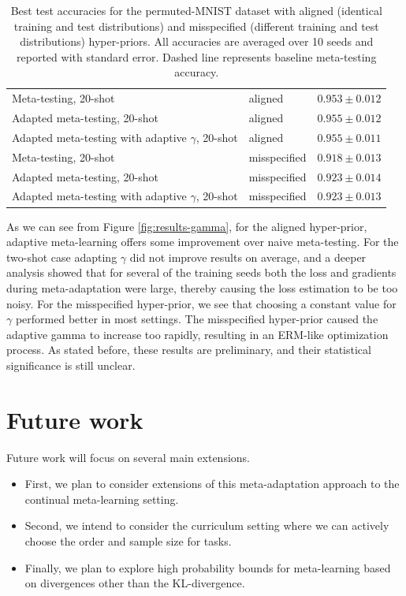 \documentclass{article}
\theoremstyle{definition}
\begin{document}
\begin{table}
\begin{tabular}{lll}
		Meta-testing, 20-shot & aligned   & $0.953\pm 0.012 $      \\
		Adapted meta-testing, 20-shot & aligned   & $0.955\pm 0.012$      \\
		Adapted meta-testing with adaptive $\gamma$, 20-shot & aligned   & $0.955\pm 0.011$      \\
		\midrule
		Meta-testing, 20-shot & misspecified   & $0.918\pm 0.013 $      \\
		Adapted meta-testing, 20-shot & misspecified   & $0.923\pm 0.014$      \\
		Adapted meta-testing with adaptive $\gamma$, 20-shot & misspecified   & $0.923\pm 0.013$    \\
		\midrule
		\bottomrule
	\end{tabular}
	\caption{Best test accuracies for the permuted-MNIST dataset with aligned (identical training and test distributions) and misspecified (different training and test distributions) hyper-priors. All accuracies are averaged over 10 seeds and reported with standard error. Dashed line represents baseline meta-testing accuracy.}
	\label{table:gamma}
\end{table}


As we can see from Figure \ref{fig:results-gamma}, for the aligned hyper-prior, adaptive meta-learning offers some improvement over naive meta-testing. For the two-shot case adapting $\gamma$ did not improve results on average, and a deeper analysis showed that for several of the training seeds both the loss and gradients during meta-adaptation were large, thereby causing the loss estimation to be too noisy. 
For the misspecified hyper-prior, we see that choosing a constant value for $\gamma$ performed better in most settings. The misspecified hyper-prior caused the adaptive gamma to increase too rapidly, resulting in an ERM-like optimization process.
As stated before, these results are preliminary, and their statistical significance is still unclear.

\section{Future work}

Future work will focus on several main extensions. 
\begin{itemize}
	\item First, we plan to consider extensions of this meta-adaptation approach to the continual meta-learning setting.
	\item Second, we intend to consider the curriculum setting where we can actively choose the order and sample size for tasks.
	\item Finally, we plan to explore high probability bounds for meta-learning based on divergences other than the KL-divergence.
\end{itemize} 
\end{document}

